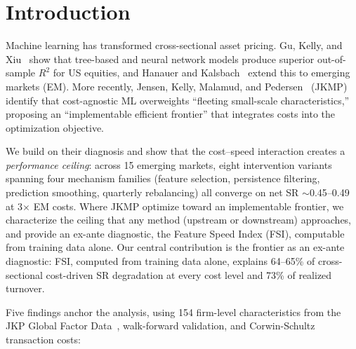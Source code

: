 \documentclass[sigconf,review,anonymous,balance=false]{acmart}
\begin{document}

\maketitle


\section{Introduction}

Machine learning has transformed cross-sectional asset pricing. Gu,
Kelly, and Xiu~\cite{gu2020empirical} show that tree-based and neural
network models produce superior out-of-sample $R^2$ for US equities,
and Hanauer and Kalsbach~\cite{hanauer2023machine} extend this to
emerging markets (EM). More recently, Jensen, Kelly, Malamud, and
Pedersen~\cite{jensen2024implementable} (JKMP) identify that
cost-agnostic ML overweights ``fleeting small-scale characteristics,''
proposing an ``implementable efficient frontier'' that integrates costs
into the optimization objective.

We build on their diagnosis and show that the cost--speed interaction
creates a \emph{performance ceiling}: across 15 emerging markets, eight
intervention variants spanning four mechanism families (feature
selection, persistence filtering,
prediction smoothing, quarterly rebalancing) all converge on
net SR ${\sim}$0.45--0.49 at 3$\times$ EM costs. Where JKMP optimize
toward an implementable frontier, we characterize the ceiling that any
method (upstream or downstream) approaches, and provide an ex-ante
diagnostic, the Feature Speed Index (FSI), computable from training
data alone. Our central contribution is the frontier as an ex-ante
diagnostic: FSI, computed from training data alone, explains 64--65\%
of cross-sectional cost-driven SR degradation at every cost level
and 73\% of realized turnover.

Five findings anchor the analysis, using 154 firm-level
characteristics from the JKP Global Factor
Data~\cite{JensenKellyPedersen2023}, walk-forward validation, and
Corwin-Schultz~\cite{corwinschultz2012} transaction costs:
\end{document}
